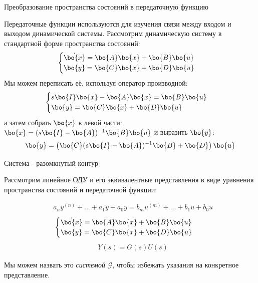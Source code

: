\documentclass{beamer}
\begin{document}
\begin{frame}{Преобразование пространства состояний в передаточную функцию}
	\begin{flushleft}
		
		Передаточные функции используются для изучения связи между входом и выходом динамической системы. Рассмотрим динамическую систему в стандартной форме пространства состояний:
		\begin{equation}
			\begin{cases}
				\dot{\bo{x}} = \bo{A}\bo{x} + \bo{B}\bo{u} \\
				\bo{y}  = \bo{C}\bo{x} + \bo{D}\bo{u}
			\end{cases}
		\end{equation}
		Мы можем переписать её, используя оператор производной:
		\begin{equation}
			\begin{cases}
				s\bo{I}\bo{x} -\bo{A}\bo{x} = \bo{B}\bo{u} \\
				\bo{y}  = \bo{C}\bo{x} + \bo{D}\bo{u}
			\end{cases}
		\end{equation}
		а затем собрать $\bo{x}$ в левой части: $\bo{x} = (s\bo{I} -\bo{A})^{-1} \bo{B}\bo{u}$ и выразить $\bo{y}$:
		\begin{equation}
			\bo{y}  = \left( \bo{C}(s\bo{I} -\bo{A})^{-1} \bo{B} + \bo{D} \right) \bo{u}
		\end{equation}
		
	\end{flushleft}
\end{frame}





\begin{frame}{Система - разомкнутый контур}
	\begin{flushleft}
		
		Рассмотрим линейное ОДУ и его эквивалентные представления в виде уравнения пространства состояний и передаточной функции:
		
		\begin{align}
			&a_n y^{(n)} + ... + a_1 \dot y + a_0 y = b_m u^{(m )}+ ... + b_1 \dot u + b_0 u
		\end{align}
		\begin{align}
			&\begin{cases}
				\dot{\bo{x}} = \bo{A}\bo{x} + \bo{B}\bo{u} \\
				\bo{y}  = \bo{C}\bo{x} + \bo{D}\bo{u}
			\end{cases}
		\end{align}
		\begin{align}
			&Y(s)  = G(s) U(s)
		\end{align}
		
		Мы можем назвать это \emph{системой} $\mathcal{G}$, чтобы избежать указания на конкретное представление.
		
	\end{flushleft}
\end{frame}
\end{document}
